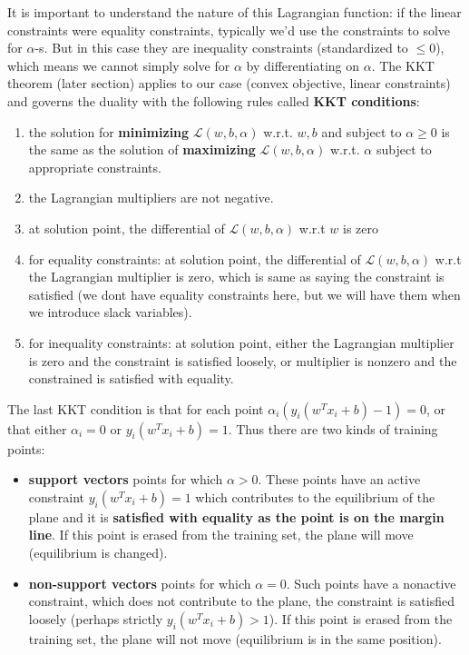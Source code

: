 \documentclass[a4paper]{article}
\begin{document}
It is important to understand the nature of this Lagrangian function: if the linear constraints were equality constraints, typically we'd use the constraints to solve for $\alpha$-s. But in this case they are inequality constraints (standardized to $\leq 0$), which means we cannot simply solve for $\alpha$ by differentiating on $\alpha$. The KKT theorem (later section) applies to our case (convex objective, linear constraints) and governs the duality with the following rules called \textbf{KKT conditions}:
\begin {enumerate} 
\item the solution for \textbf{minimizing}  $\mathcal{L}(w, b, \alpha)$ w.r.t. $w,b$ and subject to $\alpha\geq0$ is the same as the solution of \textbf{maximizing}  $\mathcal{L}(w, b, \alpha)$ w.r.t. $\alpha$ subject to appropriate constraints.
\item  the Lagrangian multipliers are not negative.
\item at solution point, the differential of $\mathcal{L}(w, b, \alpha)$ w.r.t $w$ is zero
\item for equality constraints: at solution point, the differential of $\mathcal{L}(w, b, \alpha)$ w.r.t the Lagrangian multiplier is zero, which is same as saying the constraint is satisfied (we dont have equality constraints here, but we will have them when we introduce slack variables).
\item for inequality constraints: at solution point, either the Lagrangian multiplier is zero and the constraint is satisfied loosely, or multiplier is nonzero and the constrained is satisfied with equality.
\end{enumerate}

The last KKT condition is that for each point $\alpha_i (y_i(w^T x_i +b) - 1) =0$, or that either $\alpha_i=0$ or $y_i(w^T x_i +b) =1$. Thus there are two kinds of training points:
\begin{itemize}
\item \textbf{support vectors} points for which $\alpha>0$. These points have an active constraint  $y_i (w^T x_i + b) = 1$ which contributes to the equilibrium of the plane and it is \textbf{satisfied with equality as the point is on the margin line}. If this point is erased from the training set, the plane will move (equilibrium is changed).
\item \textbf{non-support vectors} points for which $\alpha=0$. Such points have a nonactive constraint, which does not contribute to the plane, the constraint is satisfied loosely (perhaps strictly $y_i (w^T x_i + b) > 1$). If this point is erased from the training set, the plane will not move (equilibrium is in the same position).
\end{itemize}
\end{document}
